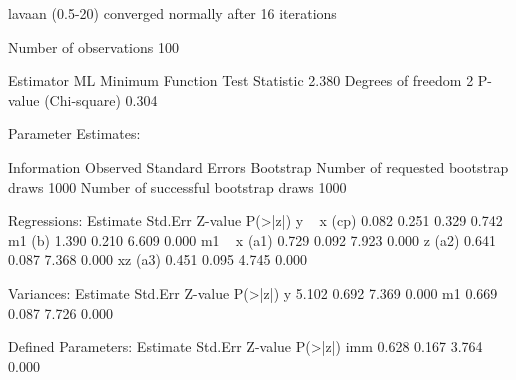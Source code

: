 \begin{Schunk}
\begin{Soutput}
lavaan (0.5-20) converged normally after  16 iterations

  Number of observations                           100

  Estimator                                         ML
  Minimum Function Test Statistic                2.380
  Degrees of freedom                                 2
  P-value (Chi-square)                           0.304

Parameter Estimates:

  Information                                 Observed
  Standard Errors                            Bootstrap
  Number of requested bootstrap draws             1000
  Number of successful bootstrap draws            1000

Regressions:
                   Estimate  Std.Err  Z-value  P(>|z|)
  y ~                                                 
    x         (cp)    0.082    0.251    0.329    0.742
    m1         (b)    1.390    0.210    6.609    0.000
  m1 ~                                                
    x         (a1)    0.729    0.092    7.923    0.000
    z         (a2)    0.641    0.087    7.368    0.000
    xz        (a3)    0.451    0.095    4.745    0.000

Variances:
                   Estimate  Std.Err  Z-value  P(>|z|)
    y                 5.102    0.692    7.369    0.000
    m1                0.669    0.087    7.726    0.000

Defined Parameters:
                   Estimate  Std.Err  Z-value  P(>|z|)
    imm               0.628    0.167    3.764    0.000
\end{Soutput}
\end{Schunk}
